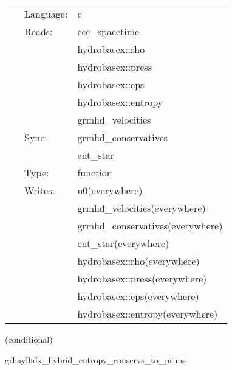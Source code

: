 \documentclass{article}
\begin{document}
\hspace{5mm}{\it entropy+hybrid version of grhaylhdx\_prims\_to\_conservs } 


\hspace{5mm}

 \begin{tabular*}{160mm}{cll} 
~ & Language:  & c \\ 
~ & Reads:  & ccc\_spacetime \\ 
~& ~ &hydrobasex::rho\\ 
~& ~ &hydrobasex::press\\ 
~& ~ &hydrobasex::eps\\ 
~& ~ &hydrobasex::entropy\\ 
~& ~ &grmhd\_velocities\\ 
~ & Sync:  & grmhd\_conservatives \\ 
~& ~ &ent\_star\\ 
~ & Type:  & function \\ 
~ & Writes:  & u0(everywhere) \\ 
~& ~ &grmhd\_velocities(everywhere)\\ 
~& ~ &grmhd\_conservatives(everywhere)\\ 
~& ~ &ent\_star(everywhere)\\ 
~& ~ &hydrobasex::rho(everywhere)\\ 
~& ~ &hydrobasex::press(everywhere)\\ 
~& ~ &hydrobasex::eps(everywhere)\\ 
~& ~ &hydrobasex::entropy(everywhere)\\ 
\end{tabular*} 


\vspace{5mm}

   (conditional) 

\hspace{5mm} grhaylhdx\_hybrid\_entropy\_conservs\_to\_prims 

\hspace{5mm}{\it entropy+hybrid version of grhaylhdx\_conservs\_to\_prims } 


\hspace{5mm}
\end{document}
